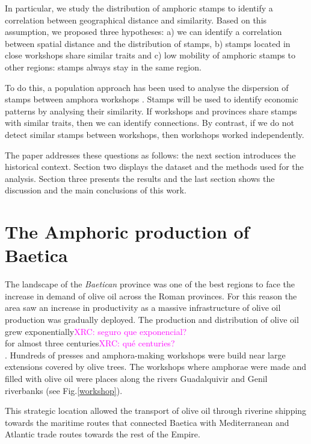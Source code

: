 \documentclass[review]{elsarticle}
\newcommand{\memo}[2]{\textcolor{#1}{#2}}
\newcommand{\xavi}[1]{\memo{magenta}{XRC: #1\\}}
\begin{document}
In particular, we study the distribution of amphoric stamps to identify a correlation between geographical distance and similarity. Based on this assumption, we proposed three hypotheses: a) we can identify a correlation between spatial distance and the distribution of stamps, b) stamps located in close workshops share similar traits and c) low mobility of amphoric stamps to other regions: stamps always stay in the same region.  

To do this, a population approach has been used to analyse the dispersion of stamps between amphora workshops \citep{rubio-campillo_ecology_2018}. Stamps will be used to identify economic patterns by analysing their similarity. If workshops and provinces share stamps with similar traits, then we can identify connections. By contrast, if we do not detect similar stamps between workshops, then workshops worked independently. 

The paper addresses these questions as follows: the next section introduces the historical context. Section two displays the dataset and the methods used for the analysis. Section three presents the results and the last section shows the discussion and the main conclusions of this work. 


\section{The Amphoric production of Baetica}

The landscape of the \textit{Baetican} province was one of the best regions to face the increase in demand of olive oil across the Roman provinces. For this reason the area saw an increase in productivity as a massive infrastructure of olive oil production was gradually deployed. The production and distribution of olive oil grew exponentially\xavi{seguro que exponencial?} for almost three centuries\xavi{qué centuries?} \citep{remesal_concierto}. Hundreds of presses and amphora-making workshops were build near large extensions covered by olive trees. The workshops where amphorae were made and filled with olive oil were places along the rivers Guadalquivir and Genil riverbanks (see Fig.\ref{workshop}).

This strategic location allowed the transport of olive oil through riverine shipping towards the maritime routes that connected Baetica with Mediterranean and Atlantic trade routes towards the rest of the Empire\citep{garcia_vargas_enrique_formal_2010}.
\end{document}
